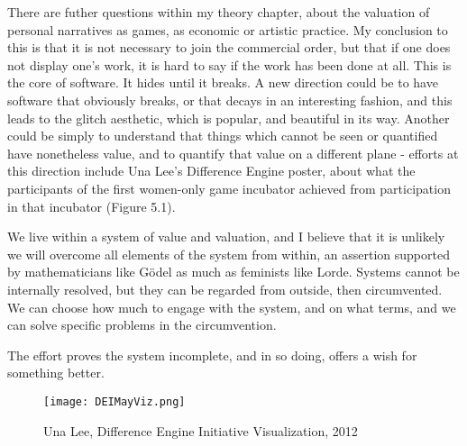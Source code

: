 There are futher questions within my theory chapter, about the valuation of personal narratives as games, as economic or artistic practice. My conclusion to this is that it is not necessary to join the commercial order, but that if one does not display one's work, it is hard to say if the work has been done at all. This is the core of software. It hides until it breaks. A new direction could be to have software that obviously breaks, or that decays in an interesting fashion, and this leads to the glitch aesthetic, which is popular, and beautiful in its way. Another could be simply to understand that things which cannot be seen or quantified have nonetheless value, and to quantify that value on a different plane - efforts at this direction include Una Lee's Difference Engine poster, about what the participants of the first women-only game incubator achieved from participation in that incubator (Figure 5.1).

We live within a system of value and valuation, and I believe that it is unlikely we will overcome all elements of the system from within, an assertion supported by mathematicians like Gödel as much as feminists like Lorde. Systems cannot be internally resolved, but they can be regarded from outside, then circumvented. We can choose how much to engage with the system, and on what terms, and we can solve specific problems in the circumvention.

The effort proves the system incomplete, and in so doing, offers a wish for something better.

\clearpage
\begin{figure}[!ht]
\centering
  \texttt{[image: DEIMayViz.png]}
 \caption{Una Lee, Difference Engine Initiative Visualization, 2012}
\end{figure}
\clearpage